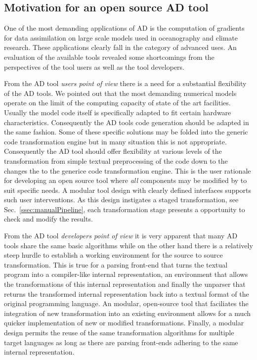 \documentclass[11pt]{article}
\newcommand{\refsec}[1]{{Sec.~\ref{#1}}}
\begin{document}
\subsection{Motivation for an open source AD tool}
One of the most demanding applications of AD is the computation of gradients for 
data assimilation on large scale models used in oceanography and climate research. 
These applications clearly fall in the category of advanced uses.
An evaluation of the available tools revealed some shortcomings from the perspectives 
of the tool users as well as the tool developers. 

From  the AD tool  {\em users point of view} there is a need for a substantial 
flexibility of the AD tools. 
We pointed out that the most demanding  numerical models 
operate on the limit of the computing capacity of state of the art facilities. 
Usually the model code itself is specifically adapted to fit certain 
hardware characteristics. 
Consequently the AD tools code generation should be adapted in the same fashion. 
Some of these specific solutions may be folded into the generic code transformation engine 
but in many situation this is not appropriate.
Consequently the AD tool should offer flexibility at various levels of the 
transformation from simple textual preprocessing of the code down to the 
changes the to the generice code transformation engine.
This is the user rationale for developing an open source tool where {\em all} 
components may be modified by to suit specific 
needs.  
A modular tool design with clearly defined interfaces supports such 
user interventions. 
As this design instigates a staged 
transformation, see \refsec{ssec:manualPipeline}, 
each transformation stage presents a opportunity to check and modify the 
results. 

From the AD tool {\em developers point of view} it is very apparent that 
many AD tools share the same basic algorithms while on the other hand 
there is a relatively steep hurdle to establish a working environment 
for the source to source transformation. 
This is true for a parsing front-end that turns the textual program into a 
compiler-like internal representation, an environment that allows the 
transformations  of this internal representation and finally the unparser that 
returns the transformed internal representation back into a textual format of the 
original programming language. An modular, open-source tool that faciliates 
the integration of new transformation into an existing environment 
allows for a much quicker implementation of new or modified  transformations.
Finally, a modular design permits the reuse of the same transformation algorithms 
for multiple target languages as long as there are parsing front-ends adhering to the 
same internal representation.
\end{document}
